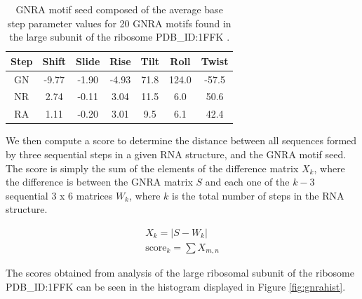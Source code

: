 \begin{table}[hb]  
\begin{center}
\begin{tabular}{|c|c|c|c|c|c|c|}
\hline
Step & Shift & Slide & Rise & Tilt & Roll & Twist \\
\hline
GN & -9.77 & -1.90 & -4.93 & 71.8 & 124.0 & -57.5 \\
NR & 2.74 & -0.11 & 3.04 & 11.5 & 6.0 & 50.6 \\
RA & 1.11 & -0.20 & 3.01 & 9.5 & 6.1 & 42.4 \\
\hline
\end{tabular}
\caption{GNRA motif  seed composed of the average  base step parameter
  values for 20 GNRA motifs found in the large subunit of the ribosome
  PDB\_ID:1FFK \cite{lemieux2006}.}
\label{tab:seed}
\end{center}
\end{table}

We  then  compute  a  score  to determine  the  distance  between  all
sequences formed by  three sequential steps in a  given RNA structure,
and the GNRA  motif seed. The score is simply the  sum of the elements
of the difference matrix $X_{k}$,  where the difference is between the
GNRA matrix $S$ and each one of the $k-3$ sequential 3 x 6 matrices
$W_{k}$, where $k$ is the total number of steps in the RNA structure.

\begin{gather}
X_{k} = |S - W_{k}| \\
\text{score}_{k} = \sum X_{m,n} 
\end{gather}  

The scores  obtained from analysis  of the large ribosomal  subunit of
the  ribosome PDB\_ID:1FFK  can be  seen in  the histogram  displayed in
Figure \ref{fig:gnrahist}.

